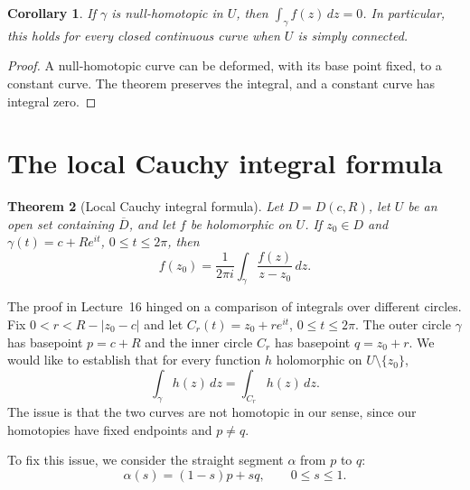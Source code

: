 \documentclass[11pt]{article}
\theoremstyle{plain}
\newtheorem{theorem}{Theorem}[section]
\newtheorem{corollary}[theorem]{Corollary}
\theoremstyle{definition}
\theoremstyle{remark}
\numberwithin{equation}{section}
\begin{document}
\begin{corollary}\label{cor:null}
If $\gamma$ is null-homotopic in $U$, then $\int_\gamma f(z)\,dz=0$.
In particular, this holds for every closed continuous curve when $U$ is
simply connected.
\end{corollary}
\begin{proof}
A null-homotopic curve can be deformed, with its base point fixed, to a
constant curve. The theorem preserves the integral, and a constant
curve has integral zero.
\end{proof}


\section{The local Cauchy integral formula}
\begin{theorem}[Local Cauchy integral formula]\label{thm:cauchy-formula}
Let $D=D(c,R)$, let $U$ be an open set containing $\overline D$, and
let $f$ be holomorphic on $U$. If $z_0\in D$ and
$\gamma(t)=c+Re^{it}$, $0\leq t\leq2\pi$, then
\[
 \boxed{\displaystyle f(z_0)=\frac{1}{2\pi i}
 \int_\gamma\frac{f(z)}{z-z_0}\,dz.}
\]
\end{theorem}

The proof in Lecture~16 hinged on a comparison of integrals over
different circles. Fix $0<r<R-|z_0-c|$ and let $C_r(t)=z_0+re^{it}$,
$0\leq t\leq2\pi$. The outer circle $\gamma$ has basepoint $p=c+R$ and
the inner circle $C_r$ has basepoint $q=z_0+r$. We would like to
establish that for every function $h$ holomorphic on $U\setminus\{z_0\}$,
\begin{equation}\label{eq:circle-comparison}
 \int_\gamma h(z)\,dz=\int_{C_r}h(z)\,dz.
\end{equation}
The issue is that the two curves are not homotopic in our sense, since
our homotopies have fixed endpoints and $p\neq q$.

To fix this issue, we consider the straight segment $\alpha$ from
$p$ to $q$:
\[
 \alpha(s)=(1-s)p+sq,\qquad 0\leq s\leq1.
\]
\end{document}
